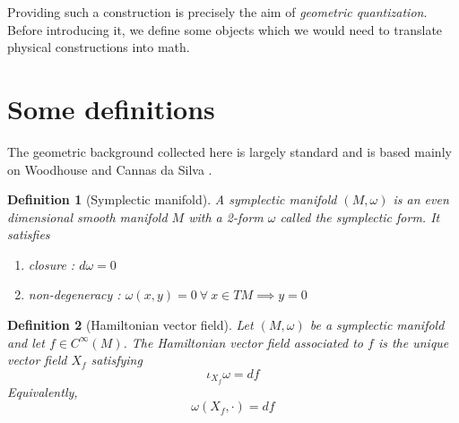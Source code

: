 \documentclass[
  12pt,
  a4paper, oneside
]{report}
\theoremstyle{bolddef}
\newtheorem{definition}{Definition}
\theoremstyle{remark}
\numberwithin{equation}{chapter}
\begin{document}
Providing such a construction is precisely the aim of
\emph{geometric quantization}\cite{Woodhouse1997}.\\
Before introducing it, we define some objects which we would need to translate physical constructions into math.


\section{Some definitions}
The geometric background collected here is largely standard and is based mainly on Woodhouse and Cannas da Silva \cite{Woodhouse1997,CannasdaSilva2001}.


\begin{definition}[Symplectic manifold]
A symplectic manifold $(M,\omega)$ is an even dimensional smooth manifold $M$ with a 2-form $\omega$ called the symplectic form. It satisfies 
\begin{enumerate}[label=\textnormal{(\arabic*)}]
\item \textit{closure} : $d\omega=0$ 
\item \textit{non-degeneracy} : $\omega(x,y)=0 \: \forall \: x \in TM \implies y = 0$
\end{enumerate}
\end{definition}

\begin{definition}[Hamiltonian vector field]
Let $(M,\omega)$ be a symplectic manifold and let 
$f\in C^\infty(M)$. 
The \textit{Hamiltonian vector field} associated to $f$ is the unique vector field 
$X_f$ satisfying
$$
\iota_{X_f}\omega = df
$$
Equivalently,
$$
\omega(X_f,\cdot)=df
$$
\end{definition}
\end{document}
